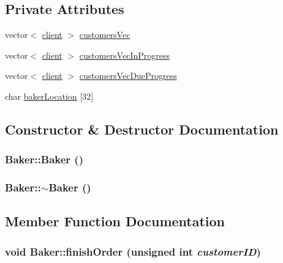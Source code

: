 \subsection*{Private Attributes}
\begin{CompactItemize}
\item 
vector$<$ \hyperlink{classclient}{client} $>$ \hyperlink{class_baker_52cc86469dd41b9be5b7186d6bd00589}{customers\-Vec}
\item 
vector$<$ \hyperlink{classclient}{client} $>$ \hyperlink{class_baker_0b7dacb9817ff529ee046a5c369051fa}{customers\-Vec\-In\-Progress}
\item 
vector$<$ \hyperlink{classclient}{client} $>$ \hyperlink{class_baker_e9843b8d2c12d0911de538ebe51c1b0d}{customers\-Vec\-Due\-Progress}
\item 
char \hyperlink{class_baker_c8a23bee3af95af3a6fa8e3f631e9a92}{baker\-Location} \mbox{[}32\mbox{]}
\end{CompactItemize}


\subsection{Constructor \& Destructor Documentation}
\hypertarget{class_baker_e162daa1f48200ac1b0470ea143378af}{
\subsubsection[Baker]{\setlength{\rightskip}{0pt plus 5cm}Baker::Baker ()}}
\label{class_baker_e162daa1f48200ac1b0470ea143378af}


\hypertarget{class_baker_aca71cde6b6b1e6315b980d299ed63ba}{
\subsubsection[$\sim$Baker]{\setlength{\rightskip}{0pt plus 5cm}Baker::$\sim$Baker ()}}
\label{class_baker_aca71cde6b6b1e6315b980d299ed63ba}




\subsection{Member Function Documentation}
\hypertarget{class_baker_222a16bf113b70cbe0388a7291978a57}{
\subsubsection[finishOrder]{\setlength{\rightskip}{0pt plus 5cm}void Baker::finish\-Order (unsigned int {\em customer\-ID})}}
\label{class_baker_222a16bf113b70cbe0388a7291978a57}


